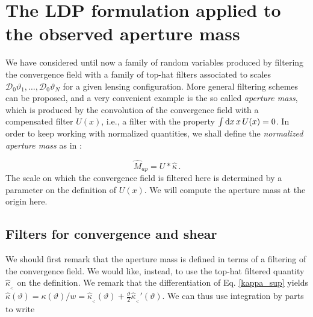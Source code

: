 \documentclass[twocolumn,aps,reprint, nofootinbib]{revtex4}
\newcommand{\dd}{{\rm d}}
\newcommand{\hkappa}{\hat{\kappa}_{_<}}
\newcommand{\mD}{{\mathcal{D}_0}}
\begin{document}
\section{The LDP formulation applied to the observed aperture mass}

We have considered until now a family of random variables produced by filtering the convergence field with a family of top-hat filters associated to scales $\mD \vartheta_1, \ldots, \mD \vartheta_N$ for a given lensing configuration. More general filtering schemes can be proposed, and a very convenient example is the so called \emph{aperture mass}, which is produced by the convolution of the convergence field with a compensated filter $U(x)$, i.e., a filter with the property $\int \dd x \, x \, U(x) = 0$. In order to keep working with normalized quantities, we shall define the \emph{normalized aperture mass} as in \cite{bernardeau2000construction}:

\begin{equation}
\hat{M}_{ap} =  U * \hat{\kappa} \, .
\end{equation}
The scale on which the convergence field is filtered here is determined by a parameter on the definition of $U(x)$. We will compute the aperture mass at the origin here. 


 
\subsection{Filters for convergence and shear}

We should first remark that the aperture mass is defined in terms of a filtering of the convergence field. We would like, instead, to use the top-hat filtered quantity $\hkappa$ on the definition. We remark that the differentiation of Eq. \eqref{kappa_sup} yields $\hat{\kappa}(\vartheta) = \kappa(\vartheta)/w = \hkappa(\vartheta) + \frac{\vartheta}{2} \hkappa'(\vartheta)$. We can thus use integration by parts to write
\end{document}
